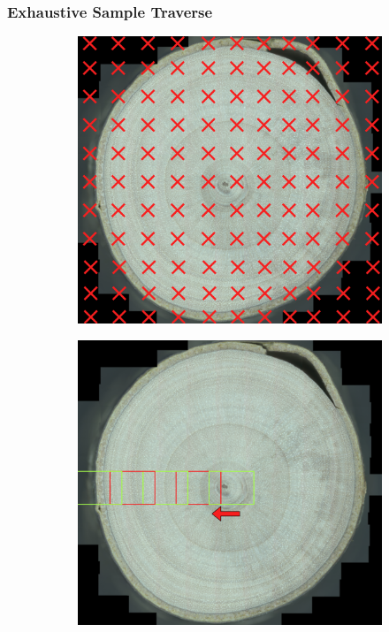 \documentclass[a4paper,12pt]{article}
\begin{document}
\subsubsection{Exhaustive Sample Traverse}  

\begin{figure}
  \centering
  \begin{subfigure}{.3\textwidth}
      \centering
      \includegraphics[width=.95\linewidth]{../content/cookie_figure_grid.png}  
      \caption{}
      \label{SUBFIGURE LABEL 1}
  \end{subfigure}
  \begin{subfigure}{.3\textwidth}
      \centering
      \includegraphics[width=.95\linewidth]{../content/cookie_figure_traverse_start.png}  

\end{subfigure}
\end{figure}
\end{document}
